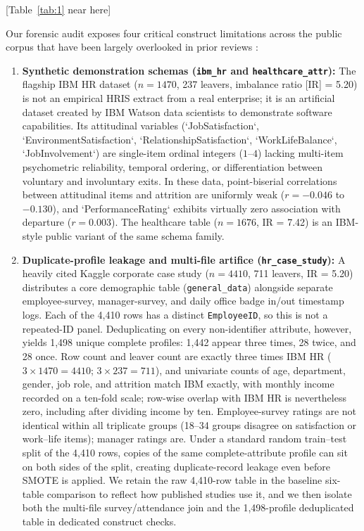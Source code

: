 \documentclass[12pt,a4paper]{article}
\begin{document}
\begin{center}
[Table~\ref{tab:1} near here]
\end{center}

Our forensic audit exposes four critical construct limitations across the public corpus that have been largely overlooked in prior reviews \parencite{ref23,ref24}:
\begin{enumerate}
\item \textbf{Synthetic demonstration schemas (\texttt{ibm\_hr} and \texttt{healthcare\_attr}):} The flagship IBM HR dataset ($n = 1470$, 237 leavers, imbalance ratio [IR] = 5.20) is not an empirical HRIS extract from a real enterprise; it is an artificial dataset created by IBM Watson data scientists to demonstrate software capabilities. Its attitudinal variables (`JobSatisfaction`, `EnvironmentSatisfaction`, `RelationshipSatisfaction`, `WorkLifeBalance`, `JobInvolvement`) are single-item ordinal integers ($1\text{--}4$) lacking multi-item psychometric reliability, temporal ordering, or differentiation between voluntary and involuntary exits. In these data, point-biserial correlations between attitudinal items and attrition are uniformly weak ($r = -0.046$ to $-0.130$), and `PerformanceRating` exhibits virtually zero association with departure ($r = 0.003$). The healthcare table ($n = 1676$, IR = 7.42) is an IBM-style public variant of the same schema family.
\item \textbf{Duplicate-profile leakage and multi-file artifice (\texttt{hr\_case\_study}):} A heavily cited Kaggle corporate case study ($n = 4410$, 711 leavers, IR = 5.20) distributes a core demographic table (\texttt{general\_data}) alongside separate employee-survey, manager-survey, and daily office badge in/out timestamp logs. Each of the 4,410 rows has a distinct \texttt{EmployeeID}, so this is not a repeated-ID panel. Deduplicating on every non-identifier attribute, however, yields 1,498 unique complete profiles: 1,442 appear three times, 28 twice, and 28 once. Row count and leaver count are exactly three times IBM HR ($3 \times 1470 = 4410$; $3 \times 237 = 711$), and univariate counts of age, department, gender, job role, and attrition match IBM exactly, with monthly income recorded on a ten-fold scale; row-wise overlap with IBM HR is nevertheless zero, including after dividing income by ten. Employee-survey ratings are not identical within all triplicate groups (18--34 groups disagree on satisfaction or work--life items); manager ratings are. Under a standard random train--test split of the 4,410 rows, copies of the same complete-attribute profile can sit on both sides of the split, creating duplicate-record leakage even before SMOTE is applied. We retain the raw 4,410-row table in the baseline six-table comparison to reflect how published studies use it, and we then isolate both the multi-file survey/attendance join and the 1,498-profile deduplicated table in dedicated construct checks.

\end{enumerate}
\end{document}
